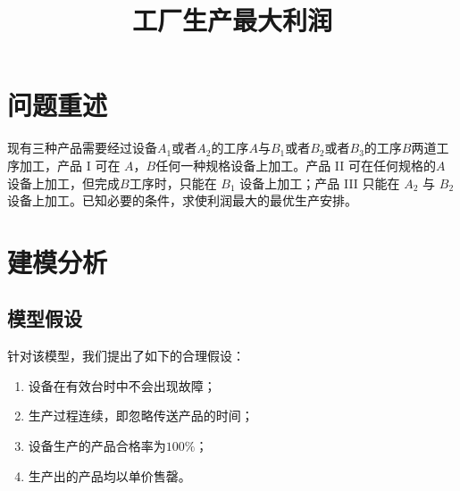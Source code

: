 \documentclass[nocover]{cumcmart}%
\begin{document}


\title{工厂生产最大利润}
\maketitle






\section{问题重述}

现有三种产品需要经过设备${A_1}$或者${A_2}$的工序${A}$与${B_1}$或者${B_2}$或者${B_3}$的工序${B}$两道工序加工，产品 I 可在 ${A}$，${B}$任何一种规格设备上加工。产品 II 可在任何规格的${A}$设备上加工，但完成${B}$工序时，只能在 ${B_1}$ 设备上加工；产品 III 只能在 ${A_2}$ 与 ${B_2}$设备上加工。已知必要的条件，求使利润最大的最优生产安排。

\section{建模分析}

\subsection{模型假设}
针对该模型，我们提出了如下的合理假设：
\begin{enumerate}
\item 设备在有效台时中不会出现故障；
\item 生产过程连续，即忽略传送产品的时间；
\item 设备生产的产品合格率为${100\%}$；
\item 生产出的产品均以单价售罄。
\end{enumerate}
\end{document}
